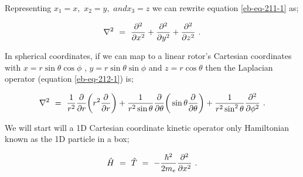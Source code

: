 \documentclass{article}
\begin{document}
Representing \begin{math} x_1 = x, \end{math} \begin{math} x_2 = y, \end{math} \begin{math} and x_3 = z \end{math} we can rewrite equation \ref{eb-eq-211-1} as;

\begin{equation} \label{eb-eq-212-1}
\nabla^2 \hspace{0.125cm} = \hspace{0.125cm} \frac{\partial^{2}}{\partial{x^{2}}} + \frac{\partial^{2}}{\partial{y^{2}}} +
\frac{\partial^{2}}{\partial{z^{2}}} \hspace{0.125cm} .
\end{equation}

In spherical coordinates, if we can map to a linear rotor's Cartesian coordinates with \begin{math} x = r\sin{\theta}\cos{\phi} \end{math} , \begin{math} y = r\sin{\theta}\sin{\phi} \end{math} and \begin{math} z = r\cos{\theta} \end{math} then the Laplacian operator (equation \ref{eb-eq-212-1}) is;

\begin{equation} \label{eb-eq-213-1}
\nabla^2 \hspace{0.125cm} = \hspace{0.125cm} \frac{1}{r^2}\frac{\partial{}}{\partial{r}}\bigg(r^2\frac{\partial{}}{\partial{r}}\bigg) + \frac{1}{r^2\sin{\theta{}}}\frac{\partial{}}{\partial{\theta{}}}\bigg(\sin{\theta}\frac{\partial{}}{\partial{\theta{}}}\bigg) + \frac{1}{r^2\sin^2{\theta{}}}\frac{\partial^{2}}{\partial{\phi^2}} \hspace{0.125cm} .
\end{equation}

We will start will a 1D Cartesian coordinate kinetic operator only Hamiltonian known as the 1D particle in a box;

\begin{equation} \label{eb-eq-214-1}
\hat{H} \hspace{0.125cm} = \hspace{0.125cm} \hat{T} \hspace{0.125cm} = \hspace{0.125cm} -\frac{\hbar^2}{2m_e}\frac{\partial^2}{\partial{x^2}} \hspace{0.125cm} .
\end{equation} 
\end{document}
